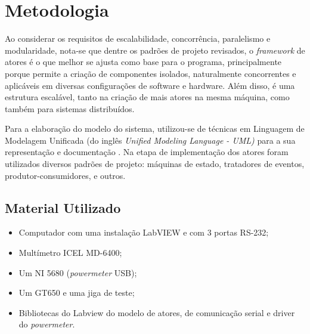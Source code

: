 \chapter{Metodologia}
\label{metodologia}


  
Ao considerar os requisitos de escalabilidade, concorrência, paralelismo e modularidade, nota-se que dentre os padrões de projeto revisados, o \textit{framework} de atores é o que melhor se ajusta como base para o programa, principalmente porque permite a criação de componentes isolados, naturalmente concorrentes e aplicáveis em diversas configurações de software e hardware. Além disso, é uma estrutura escalável, tanto na criação de mais atores na mesma máquina, como também para sistemas distribuídos.

Para a elaboração do modelo do sistema, utilizou-se de técnicas em Linguagem de Modelagem Unificada (do inglês \textit{Unified Modeling Language - UML)} para a sua representação e documentação \citep{rumbaugh2004unified}. Na etapa de implementação dos atores foram utilizados diversos padrões de projeto: máquinas de estado, tratadores de eventos, produtor-consumidores, e outros.

\section{Material Utilizado}
    \begin{itemize}
        \item Computador com uma instalação LabVIEW e com 3 portas RS-232;
        \item Multímetro ICEL MD-6400; 
        \item Um NI 5680 (\textit{powermeter} USB);
        \item Um GT650 e uma jiga de teste;
        \item Bibliotecas do Labview do modelo de atores, de comunicação serial e driver do \textit{powermeter}.
    \end{itemize}
